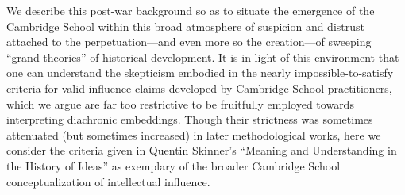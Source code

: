 \documentclass[11pt]{article}
\begin{document}
We describe this post-war background so as to situate the emergence of the Cambridge School within this broad atmosphere of suspicion and distrust attached to the perpetuation---and even more so the creation---of sweeping ``grand theories'' of historical development. It is in light of this environment that one can understand the skepticism
embodied in the nearly impossible-to-satisfy criteria for valid influence claims developed by Cambridge School practitioners, which we argue are far too restrictive to be fruitfully employed towards interpreting diachronic embeddings. Though their strictness was sometimes attenuated (but sometimes increased) in later methodological works, here we consider the criteria given in Quentin Skinner's ``Meaning and Understanding in the History of Ideas'' as exemplary of the broader Cambridge School conceptualization of intellectual influence. 
\end{document}
